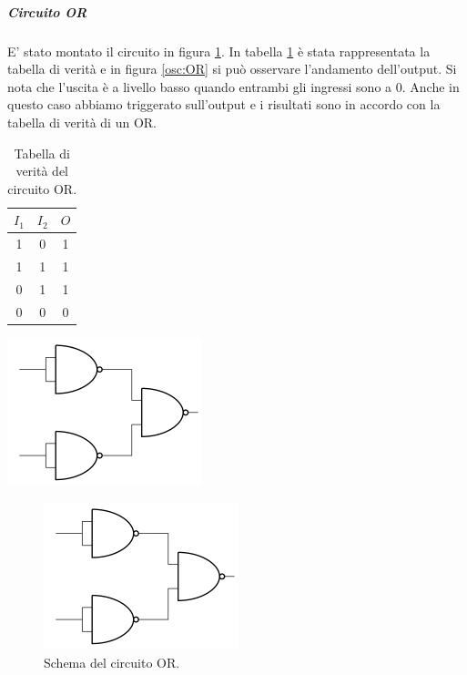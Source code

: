 \documentclass[10pt,a4paper]{article}
\begin{document}
\subparagraph{Circuito OR}

E' stato montato il circuito in figura \ref{fig:OR}. In tabella \ref{tab:OR} è stata rappresentata la tabella di verità e in figura \ref{osc:OR} si può osservare l'andamento dell'output. Si nota che l'uscita è a livello basso quando entrambi gli ingressi sono a 0. Anche in questo caso abbiamo triggerato sull'output e i risultati sono in accordo con la tabella di verità di un OR.


\begin{center}
\begin{minipage}{0.3\textwidth}
\begin{table}[!htb]
\begin{tabular}{|c|c|c|}
\hline 
$I_1$ & $I_2$ & $O$ \\
\hline
 1 &  0 & 1\\ 

 1 &  1 & 1\\ 
 
 0 &  1 & 1\\ 
 
 0 &  0 & 0\\ 
\hline 
\end{tabular} 
\caption{Tabella di verità del circuito OR.\label{tab:OR}}
\end{table}
\end{minipage}\qquad
\includegraphics[width=.4\textwidth]{OR.png}
\end{center}

\begin{figure}[!htb]
  \centering
  \includegraphics[scale=0.5]{OR.png}
\caption{Schema del circuito OR.\label{fig:OR}}
\end{figure}
\end{document}
